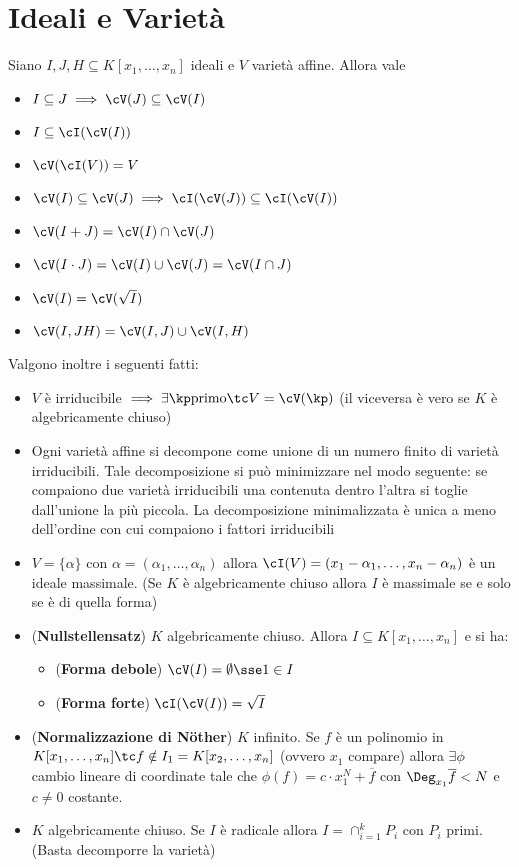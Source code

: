 \documentclass[a4paper,NoNotes,GeneralMath]{stdmdoc}
\begin{document}
	\section*{Ideali e Varietà}
	Siano $I, J, H \subseteq K[x_1, \ldots, x_n]$ ideali e $V$ varietà affine. Allora vale
	\begin{itemize}
		\item $I \subseteq J \implies \cV(J) \subseteq \cV(I)$
		\item $I \subseteq \cI(\cV(I))$
		\item $\cV(\cI(V)) = V$
		\item $\cV(I) \subseteq \cV(J) \implies \cI(\cV(J)) \subseteq \cI(\cV(I))$
		\item $\cV(I + J) = \cV(I) \cap \cV(J)$
		\item $\cV(I\cdot J) = \cV(I) \cup \cV(J) = \cV(I \cap J)$
		\item $\cV(I) = \cV(\sqrt{I})$
		\item $\cV(I, JH) = \cV(I, J) \cup \cV(I, H)$
	\end{itemize}
	Valgono inoltre i seguenti fatti:
	\begin{itemize}
		\item $V$ è irriducibile $\implies \exists \kp \text{primo} \tc V = \cV(\kp)$ (il viceversa è vero se $K$ è algebricamente chiuso)
		\item Ogni varietà affine si decompone come unione di un numero finito di varietà irriducibili. Tale decomposizione si può minimizzare nel modo seguente: se compaiono due varietà irriducibili una contenuta dentro l'altra si toglie dall'unione la più piccola. La decomposizione minimalizzata è unica a meno dell'ordine con cui compaiono i fattori irriducibili
		\item $V = \{\alpha\}$ con $\alpha = (\alpha_1, \ldots, \alpha_n)$ allora $\cI(V) = (x_1 - \alpha_1, \ldots, x_n - \alpha_n)$ è un ideale massimale. (Se $K$ è algebricamente chiuso allora $I$ è massimale se e solo se è di quella forma)
		\item ({\bf Nullstellensatz}) $K$ algebricamente chiuso. Allora $I \subseteq K[x_1, \ldots, x_n]$ e si ha:
			\begin{itemize}
				\item ({\bf Forma debole}) $\cV(I) = \emptyset \sse 1 \in I$
				\item ({\bf Forma forte}) $\cI(\cV(I)) = \sqrt{I}$
			\end{itemize}
		\item ({\bf Normalizzazione di Nöther}) $K$ infinito. Se $f$ è un polinomio in $K[x_1, \ldots, x_n] \tc f \notin I_1 = K[x_2, \ldots, x_n]$ (ovvero $x_1$ compare) allora $\exists \phi$ cambio lineare di coordinate tale che $\phi(f) = c \cdot x_1^N + \overline{f}$ con $\Deg_{x_1} \overline{f} < N$ e $c \neq 0$ costante. 
		\item $K$ algebricamente chiuso. Se $I$ è radicale allora $I = \cap_{i=1}^k P_i$ con $P_i$ primi. (Basta decomporre la varietà)
	\end{itemize}
	
\end{document}
